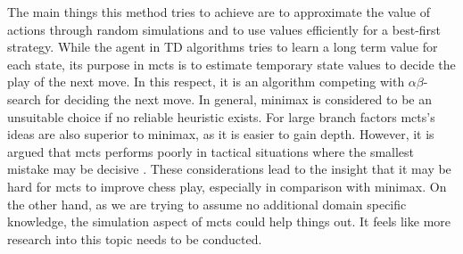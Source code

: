 The main things this method tries to achieve are to approximate the value of actions through random simulations and to use values efficiently for a best-first strategy. While the agent in TD algorithms tries to learn a long term value for each state, its purpose in \gls{mcts} is to estimate temporary state values to decide the play of the next move. In this respect, it is an algorithm competing with $\alpha\beta$-search for deciding the next move. In general, minimax is considered to be an unsuitable choice if no reliable heuristic exists. For large branch factors \gls{mcts}'s ideas are also superior to minimax, as it is easier to gain depth. However, it is argued that \gls{mcts} performs poorly in tactical situations where the smallest mistake may be decisive \cite{rama11}. These considerations lead to the insight that it may be hard for \gls{mcts} to improve chess play, especially in comparison with minimax. On the other hand, as we are trying to assume no additional domain specific knowledge, the simulation aspect of \gls{mcts} could help things out. It feels like more research into this topic needs to be conducted.

